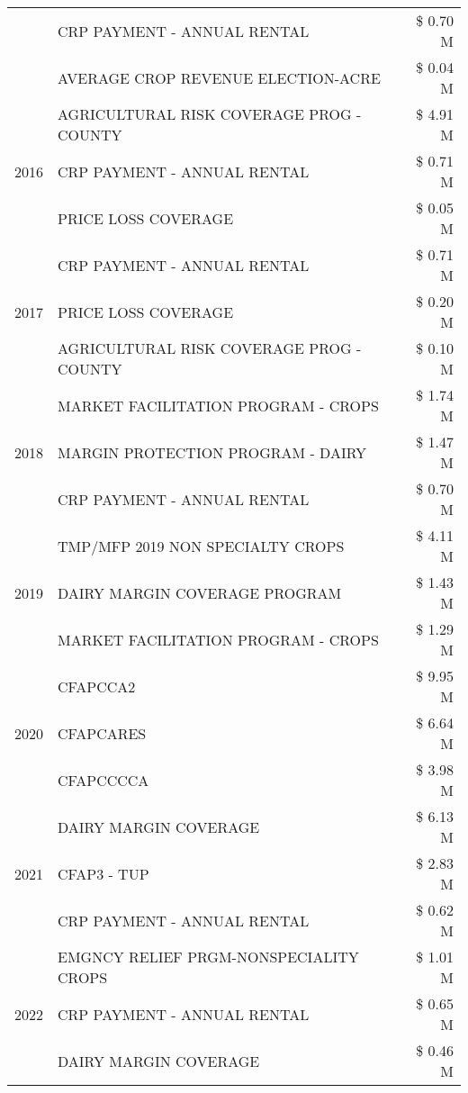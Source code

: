 \begin{tabular}{llr}
 & CRP PAYMENT - ANNUAL RENTAL & \$ 0.70 M \\
 & AVERAGE CROP REVENUE ELECTION-ACRE & \$ 0.04 M \\
\cline{1-3}
\multirow[t]{3}{*}{2016} & AGRICULTURAL RISK COVERAGE PROG - COUNTY & \$ 4.91 M \\
 & CRP PAYMENT - ANNUAL RENTAL & \$ 0.71 M \\
 & PRICE LOSS COVERAGE & \$ 0.05 M \\
\cline{1-3}
\multirow[t]{3}{*}{2017} & CRP PAYMENT - ANNUAL RENTAL & \$ 0.71 M \\
 & PRICE LOSS COVERAGE & \$ 0.20 M \\
 & AGRICULTURAL RISK COVERAGE PROG - COUNTY & \$ 0.10 M \\
\cline{1-3}
\multirow[t]{3}{*}{2018} & MARKET FACILITATION PROGRAM - CROPS & \$ 1.74 M \\
 & MARGIN PROTECTION PROGRAM - DAIRY & \$ 1.47 M \\
 & CRP PAYMENT - ANNUAL RENTAL & \$ 0.70 M \\
\cline{1-3}
\multirow[t]{3}{*}{2019} & TMP/MFP 2019 NON SPECIALTY CROPS & \$ 4.11 M \\
 & DAIRY MARGIN COVERAGE PROGRAM & \$ 1.43 M \\
 & MARKET FACILITATION PROGRAM - CROPS & \$ 1.29 M \\
\cline{1-3}
\multirow[t]{3}{*}{2020} & CFAPCCA2 & \$ 9.95 M \\
 & CFAPCARES & \$ 6.64 M \\
 & CFAPCCCCA & \$ 3.98 M \\
\cline{1-3}
\multirow[t]{3}{*}{2021} & DAIRY MARGIN COVERAGE & \$ 6.13 M \\
 & CFAP3 - TUP & \$ 2.83 M \\
 & CRP PAYMENT - ANNUAL RENTAL & \$ 0.62 M \\
\cline{1-3}
\multirow[t]{3}{*}{2022} & EMGNCY RELIEF PRGM-NONSPECIALITY CROPS & \$ 1.01 M \\
 & CRP PAYMENT - ANNUAL RENTAL & \$ 0.65 M \\
 & DAIRY MARGIN COVERAGE & \$ 0.46 M \\
\cline{1-3}
\bottomrule
\end{tabular}

